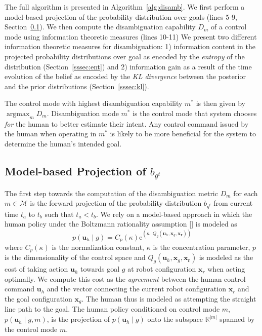 \documentclass[conference]{IEEEtran}
\DeclareMathOperator*{\argmax}{argmax}
\begin{document}
The full algorithm is presented in Algorithm~\ref{alg:disamb}. We first perform a model-based projection of the probability distribution over goals (lines 5-9, Section~\ref{ssec:model_based}). We then compute the disambiguation capability $D_m$ of a control mode using information theoretic measures (lines 10-11) We present two different information theoretic measures for disambiguation: 1) information content in the projected probability distributions over goal as encoded by the \textit{entropy} of the distribution (Section~\ref{sssec:ent}) and 2) information gain as a result of the time evolution of the belief as encoded by the \textit{KL divergence} between the posterior and the prior distributions (Section~\ref{sssec:kl}). 

The control mode with highest disambiguation capability $m^*$ is then given by $\argmax_m D_m$. Disambiguation mode $m^*$ is the control mode that system chooses \textit{for} the human to better estimate their intent. Any control command issued by the human when operating in $m^*$ is likely to be more beneficial for the system to determine the human's intended goal. 
\subsection{Model-based Projection of $b_{g^t}$}\label{ssec:model_based}
The first step towards the computation of the disambiguation metric $D_m$ for each $m \in \mathcal{M}$ is the forward projection of the probability distribution $b_{g^t}$ from current time $t_a$ to $t_b$ such that $t_a < t_b$. We rely on a model-based approach in which the human policy under the Boltzmann rationality assumption [] is modeled as
\begin{equation}
	p(\boldsymbol{u}_h \;| \;g ) = C_p(\kappa)\text{e}^{(\kappa\cdot Q_g(\boldsymbol{u}_h, \boldsymbol{x}_g, \boldsymbol{x_r}))}
\end{equation}
where $C_p(\kappa)$ is the normalization constant, $\kappa$ is the concentration parameter, $p$ is the dimensionality of the control space and $Q_g(\boldsymbol{u}_h, \boldsymbol{x}_g, \boldsymbol{x_r})$ is modeled as the cost of taking action $\boldsymbol{u}_h$ towards goal $g$ at robot configuration $\boldsymbol{x}_r$ when acting optimally. We compute this cost as the \textit{agreement} between the human control command $\boldsymbol{u}_h$ and the vector connecting the current robot configuration $\boldsymbol{x}_r$ and the goal configuration $\boldsymbol{x}_g$. The human thus is modeled as attempting the straight line path to the goal. The human policy conditioned on control mode $m$, $p(\boldsymbol{u}_h \;| \;g, m )$, is the projection of $p(\boldsymbol{u}_h \;| \;g )$ onto the subspace $\mathbb{R}^{|m|}$ spanned by the control mode $m$. 
\end{document}
